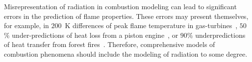 Misrepresentation of radiation in combustion modeling can lead to significant errors in the prediction of flame properties. These errors may present themselves, for example, in $200$~K differences of peak flame temperature in gas-turbines~\cite{Gamil2020AssessmentChamber}, $50$\% under-predictions of heat loss from a piston engine~\cite{Modest2016RadiativeSystems}, or $90$\% underpredictions of heat transfer from forest fires~\cite{Valendik2008EffectEnvironment}.
Therefore, comprehensive models of combustion phenomena should include the modeling of radiation to some degree.















